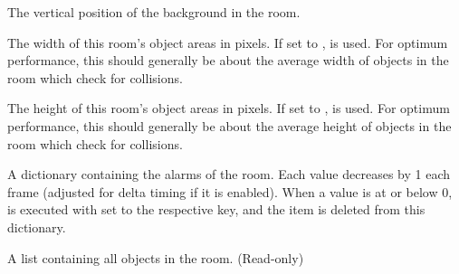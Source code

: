 \documentclass[letterpaper,10pt,english]{sphinxmanual}
\begin{document}
\begin{fulllineitems}
\begin{fulllineitems}
\end{fulllineitems}


\begin{fulllineitems}
\label{dsp:sge.dsp.Room.background_y}
The vertical position of the background in the room.

\end{fulllineitems}


\begin{fulllineitems}
\label{dsp:sge.dsp.Room.object_area_width}
The width of this room's object areas in pixels.  If set to
,  is used.  For optimum
performance, this should generally be about the average width of
objects in the room which check for collisions.

\end{fulllineitems}


\begin{fulllineitems}
\label{dsp:sge.dsp.Room.object_area_height}
The height of this room's object areas in pixels.  If set to
,  is used.  For optimum
performance, this should generally be about the average height of
objects in the room which check for collisions.

\end{fulllineitems}


\begin{fulllineitems}
\label{dsp:sge.dsp.Room.alarms}
A dictionary containing the alarms of the room.  Each value
decreases by 1 each frame (adjusted for delta timing if it is
enabled).  When a value is at or below 0,
{\hyperref[dsp:sge.dsp.Room.event_alarm]{\emph{}}} is executed with  set to the
respective key, and the item is deleted from this dictionary.

\end{fulllineitems}


\begin{fulllineitems}
\label{dsp:sge.dsp.Room.objects}
A list containing all {\hyperref[dsp:sge.dsp.Object]{\emph{}}} objects in the
room.  (Read-only)


\end{fulllineitems}
\end{fulllineitems}
\end{document}

